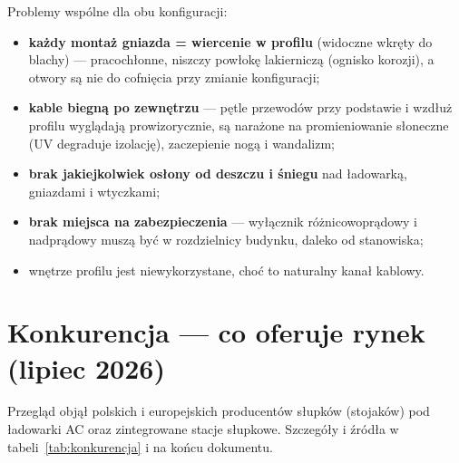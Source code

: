\documentclass[11pt,a4paper]{article}
\begin{document}
Problemy wspólne dla obu konfiguracji:
\begin{itemize}
\item \textbf{każdy montaż gniazda = wiercenie w profilu} (widoczne wkręty do blachy) --- pracochłonne,
niszczy powłokę lakierniczą (ognisko korozji), a otwory są nie do cofnięcia przy zmianie konfiguracji;
\item \textbf{kable biegną po zewnętrzu} --- pętle przewodów przy podstawie i wzdłuż profilu wyglądają
prowizorycznie, są narażone na promieniowanie słoneczne (UV degraduje izolację), zaczepienie nogą
i wandalizm;
\item \textbf{brak jakiejkolwiek osłony od deszczu i śniegu} nad ładowarką, gniazdami i wtyczkami;
\item \textbf{brak miejsca na zabezpieczenia} --- wyłącznik różnicowoprądowy i nadprądowy muszą być
w rozdzielnicy budynku, daleko od stanowiska;
\item wnętrze profilu jest niewykorzystane, choć to naturalny kanał kablowy.
\end{itemize}

\section{Konkurencja --- co oferuje rynek (lipiec 2026)}
\label{sec:konkurencja}
Przegląd objął polskich i europejskich producentów słupków (stojaków) pod ładowarki AC oraz
zintegrowane stacje słupkowe. Szczegóły i źródła w tabeli~\ref{tab:konkurencja} i na końcu dokumentu.
\end{document}
